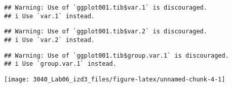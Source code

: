 \documentclass[
]{article}
\newenvironment{Shaded}{\begin{snugshade}}{\end{snugshade}}
\newcommand{\AttributeTok}[1]{\textcolor[rgb]{0.13,0.29,0.53}{#1}}
\newcommand{\CommentTok}[1]{\textcolor[rgb]{0.56,0.35,0.01}{\textit{#1}}}
\newcommand{\DecValTok}[1]{\textcolor[rgb]{0.00,0.00,0.81}{#1}}
\newcommand{\FloatTok}[1]{\textcolor[rgb]{0.00,0.00,0.81}{#1}}
\newcommand{\FunctionTok}[1]{\textcolor[rgb]{0.13,0.29,0.53}{\textbf{#1}}}
\newcommand{\NormalTok}[1]{#1}
\newcommand{\OtherTok}[1]{\textcolor[rgb]{0.56,0.35,0.01}{#1}}
\newcommand{\SpecialCharTok}[1]{\textcolor[rgb]{0.81,0.36,0.00}{\textbf{#1}}}
\begin{document}
\begin{Shaded}
\end{Shaded}

\begin{verbatim}
## Warning: Use of `ggplot001.tib$var.1` is discouraged.
## i Use `var.1` instead.
\end{verbatim}

\begin{verbatim}
## Warning: Use of `ggplot001.tib$var.2` is discouraged.
## i Use `var.2` instead.
\end{verbatim}

\begin{verbatim}
## Warning: Use of `ggplot001.tib$group.var.1` is discouraged.
## i Use `group.var.1` instead.
\end{verbatim}

\texttt{[image: 3040\_Lab06\_izd3\_files/figure-latex/unnamed-chunk-4-1]}
\end{document}
